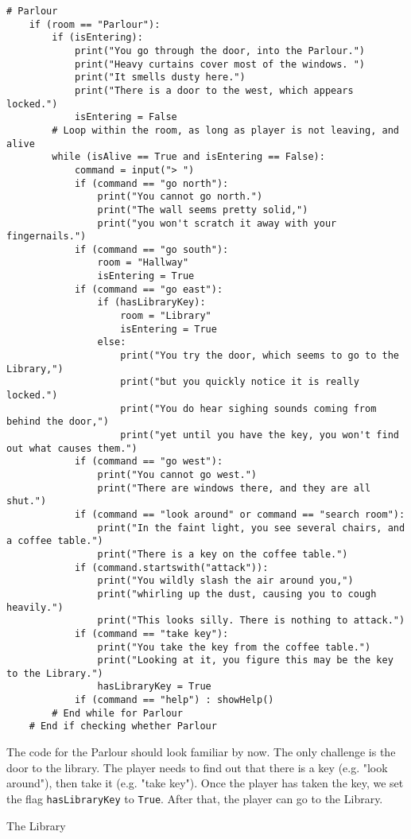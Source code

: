 \begin{lstlisting}[firstnumber=last]
    # Parlour
    if (room == "Parlour"):
        if (isEntering):
            print("You go through the door, into the Parlour.")
            print("Heavy curtains cover most of the windows. ")
            print("It smells dusty here.")
            print("There is a door to the west, which appears locked.")
            isEntering = False
        # Loop within the room, as long as player is not leaving, and alive
        while (isAlive == True and isEntering == False):
            command = input("> ")
            if (command == "go north"):
                print("You cannot go north.")
                print("The wall seems pretty solid,")
                print("you won't scratch it away with your fingernails.")
            if (command == "go south"):
                room = "Hallway"
                isEntering = True
            if (command == "go east"):
                if (hasLibraryKey):
                    room = "Library"
                    isEntering = True
                else:
                    print("You try the door, which seems to go to the Library,")
                    print("but you quickly notice it is really locked.")
                    print("You do hear sighing sounds coming from behind the door,")
                    print("yet until you have the key, you won't find out what causes them.")
            if (command == "go west"):
                print("You cannot go west.")
                print("There are windows there, and they are all shut.")
            if (command == "look around" or command == "search room"):
                print("In the faint light, you see several chairs, and a coffee table.")
                print("There is a key on the coffee table.")
            if (command.startswith("attack")):
                print("You wildly slash the air around you,")
                print("whirling up the dust, causing you to cough heavily.")
                print("This looks silly. There is nothing to attack.")
            if (command == "take key"):
                print("You take the key from the coffee table.")
                print("Looking at it, you figure this may be the key to the Library.")
                hasLibraryKey = True
            if (command == "help") : showHelp()
        # End while for Parlour
    # End if checking whether Parlour
\end{lstlisting}

The code for the Parlour should look familiar by now. The only challenge is the door to the library. The player needs to find out that there is a key (e.g. "look around"), then take it (e.g. "take key"). Once the player has taken the key, we set the flag \texttt{hasLibraryKey} to \texttt{True}. After that, the player can go to the Library. 

The Library  











   